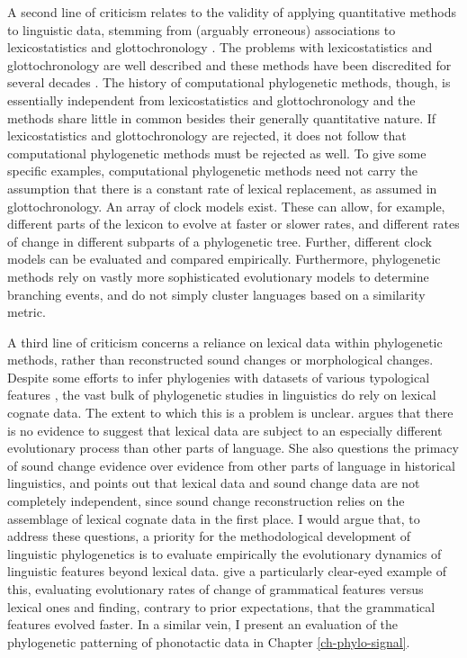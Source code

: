 A second line of criticism relates to the validity of applying quantitative methods to linguistic data, stemming from (arguably erroneous) associations to lexicostatistics and glottochronology \autocites{eska_recent_2004}{holm_new_2007}. The problems with lexicostatistics and glottochronology are well described and these methods have been discredited for several decades \autocite[see][pp.~285--286]{bowern_computational_2018}. The history of computational phylogenetic methods, though, is essentially independent from lexicostatistics and glottochronology and the methods share little in common besides their generally quantitative nature. If lexicostatistics and glottochronology are rejected, it does not follow that computational phylogenetic methods must be rejected as well. To give some specific examples, computational phylogenetic methods need not carry the assumption that there is a constant rate of lexical replacement, as assumed in glottochronology. An array of clock models exist. These can allow, for example, different parts of the lexicon to evolve at faster or slower rates, and different rates of change in different subparts of a phylogenetic tree. Further, different clock models can be evaluated and compared empirically. Furthermore, phylogenetic methods rely on vastly more sophisticated evolutionary models to determine branching events, and do not simply cluster languages based on a similarity metric.

A third line of criticism concerns a reliance on lexical data within phylogenetic methods, rather than reconstructed sound changes or morphological changes. Despite some efforts to infer phylogenies with datasets of various typological features \autocites[e.g.][]{dunn_structural_2005}{dunn_structural_2008}, the vast bulk of phylogenetic studies in linguistics do rely on lexical cognate data. The extent to which this is a problem is unclear. \textcite{bowern_computational_2018} argues that there is no evidence to suggest that lexical data are subject to an especially different evolutionary process than other parts of language. She also questions the primacy of sound change evidence over evidence from other parts of language in historical linguistics, and points out that lexical data and sound change data are not completely independent, since sound change reconstruction relies on the assemblage of lexical cognate data in the first place. I would argue that, to address these questions, a priority for the methodological development of linguistic phylogenetics is to evaluate empirically the evolutionary dynamics of linguistic features beyond lexical data. \textcite{greenhill_evolutionary_2017} give a particularly clear-eyed example of this, evaluating evolutionary rates of change of grammatical features versus lexical ones and finding, contrary to prior expectations, that the grammatical features evolved faster. In a similar vein, I present an evaluation of the phylogenetic patterning of phonotactic data in Chapter \ref{ch-phylo-signal}.

